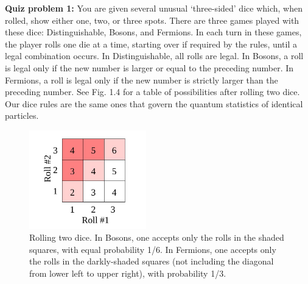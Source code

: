 \documentclass[10pt]{article}
\begin{document}
\noindent\textbf{Quiz problem 1:}  You are given several unusual ‘three-sided’ dice which, when rolled, show either one, two, or three spots. There are three games played with these dice: Distinguishable, Bosons, and Fermions. In each turn in these games, the player rolls one die at a time, starting over if required by the rules, until a legal combination occurs. In Distinguishable, all rolls are legal. In Bosons, a roll is legal only if the new number is larger or equal to the preceding number. In Fermions, a roll is legal only if the new number is strictly larger than the preceding number. See Fig. 1.4 for a table of possibilities after rolling two dice. Our dice rules are the same ones that govern the quantum statistics of identical particles.

\begin{figure}[h]
    \centering
    \includegraphics[width=2in]{Quizzes/fig1_4.png}\caption{Rolling two dice. In Bosons, one accepts only the rolls in the shaded squares, with equal probability 1/6. In Fermions, one accepts only the rolls in the darkly-shaded squares (not including the diagonal from lower left to upper right), with probability 1/3.}
    \label{fig:my_label}
\end{figure}
\end{document}
